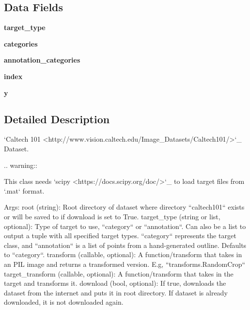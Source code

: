 \subsection*{Data Fields}
\begin{DoxyCompactItemize}
\item 
\mbox{\label{classtorchvision_1_1datasets_1_1caltech_1_1Caltech101_a5ccb1048ed503cdbc53147188e6e3045}} 
{\bfseries target\+\_\+type}
\item 
\mbox{\label{classtorchvision_1_1datasets_1_1caltech_1_1Caltech101_ae23953164bdde22965050d6ad9cdc35e}} 
{\bfseries categories}
\item 
\mbox{\label{classtorchvision_1_1datasets_1_1caltech_1_1Caltech101_a515b1ba0b8bdc812e2945a78162f4ea7}} 
{\bfseries annotation\+\_\+categories}
\item 
\mbox{\label{classtorchvision_1_1datasets_1_1caltech_1_1Caltech101_adea73e93691ec954e9cf55cdb5bb6aae}} 
{\bfseries index}
\item 
\mbox{\label{classtorchvision_1_1datasets_1_1caltech_1_1Caltech101_a0d49d9f8af3818da504f190e949c031e}} 
{\bfseries y}
\end{DoxyCompactItemize}


\subsection{Detailed Description}
\begin{DoxyVerb}`Caltech 101 <http://www.vision.caltech.edu/Image_Datasets/Caltech101/>`_ Dataset.

.. warning::

    This class needs `scipy <https://docs.scipy.org/doc/>`_ to load target files from `.mat` format.

Args:
    root (string): Root directory of dataset where directory
        ``caltech101`` exists or will be saved to if download is set to True.
    target_type (string or list, optional): Type of target to use, ``category`` or
    ``annotation``. Can also be a list to output a tuple with all specified target types.
    ``category`` represents the target class, and ``annotation`` is a list of points
    from a hand-generated outline. Defaults to ``category``.
    transform (callable, optional): A function/transform that takes in an PIL image
        and returns a transformed version. E.g, ``transforms.RandomCrop``
    target_transform (callable, optional): A function/transform that takes in the
        target and transforms it.
    download (bool, optional): If true, downloads the dataset from the internet and
        puts it in root directory. If dataset is already downloaded, it is not
        downloaded again.
\end{DoxyVerb}
 

